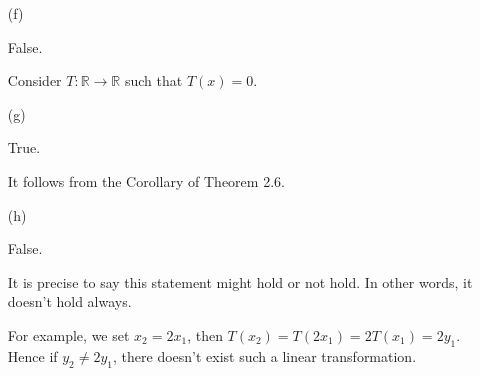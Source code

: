 \begin{Exercise}
\begin{enumerate}[(a)]
		\item[(f)]
		\begin{answer}
			False.
		\end{answer}
		\begin{solution}
			Consider $T:\mathbb{R}\to\mathbb{R}$ such that $T(x) = 0$.
		\end{solution}
		
		\item[(g)]
		\begin{answer}
			True.
		\end{answer}
		\begin{solution}
			It follows from the Corollary of Theorem 2.6.
		\end{solution}
		
		\item[(h)]
		\begin{answer}
			False.
		\end{answer}
		\begin{solution}
			It is precise to say this statement might hold or not hold. In other words, it doesn't hold always.
			
			For example, we set $x_2 = 2x_1$, then $T(x_2) = T(2 x_1) = 2T(x_1) = 2 y_1$. Hence if $y_2\neq 2 y_1$, there doesn't exist such a linear transformation.
		\end{solution}
	\end{enumerate}
\end{Exercise}